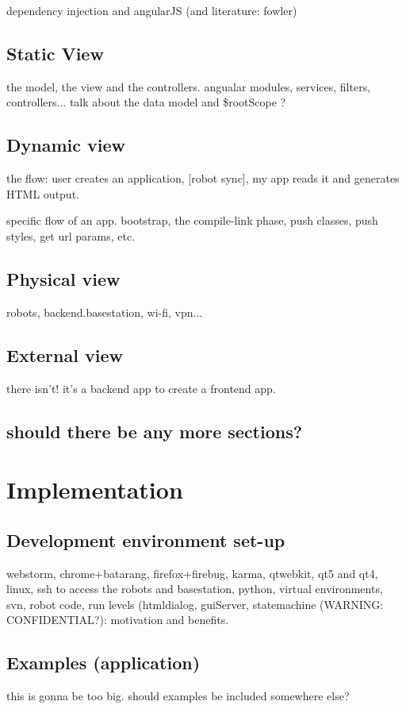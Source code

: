 dependency injection and angularJS (and literature: fowler)

\section{Static View}
the model, the view and the controllers. angualar modules, services, filters, controllers...
talk about the data model and \$rootScope ?

\section{Dynamic view}
the flow: user creates an application, [robot sync], my app reads it and generates HTML output.

specific flow of an app. bootstrap, the compile-link phase, push classes, push styles, get url params, etc.

\section{Physical view}
robots, backend.basestation, wi-fi, vpn...

\section{External view}
there isn't! it's a backend app to create a frontend app.

\section{should there be any more sections?}

\chapter{Implementation}
\section{Development environment set-up}
webstorm, chrome+batarang, firefox+firebug, karma, qtwebkit, qt5 and qt4, linux, ssh to access the robots and basestation, python, virtual environments, svn, robot code, run levels (htmldialog, guiServer, statemachine (WARNING: CONFIDENTIAL?): motivation and benefits.

\section{Examples (application)}
this is gonna be too big. should examples be included somewhere else?

